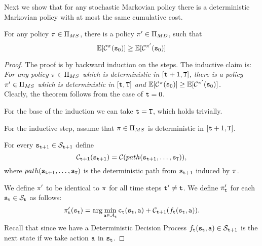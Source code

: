 Next we show that for any stochastic Markovian policy there is a
deterministic Markovian policy with at most the same cumulative
cost.

\begin{theorem}
\label{chp2:stochastic-deterministic}
For any policy $\pi\in \Pi_{MS}$, there is a policy
$\pi'\in\Pi_{MD}$, such that
\[
\mathbb{E}[\mathcal{C}^\pi({\tt s}_0)]\geq \mathbb{E}[\mathcal{C}^{\pi'}({\tt s}_0)]
\]
\end{theorem}

\begin{proof}
The proof is by backward induction on the steps. The inductive claim is:\\
{\em For any policy $\pi\in \Pi_{MS}$ which is deterministic in
$[{\tt t}+1,{\tt T}]$, there is a policy $\pi'\in \Pi_{MS}$
which is deterministic in $[{\tt t},{\tt T}]$ and
$\mathbb{E}[\mathcal{C}^\pi({\tt s}_0)]\geq
\mathbb{E}[\mathcal{C}^{\pi'}({\tt s}_0)]$.}\\
Clearly, the theorem follows from the case of ${\tt t}=0$.

For the base of the induction we can take ${\tt t}={\tt T}$, which
holds trivially.

For the inductive step, assume that $\pi\in \Pi_{MS}$ is
deterministic in $[{\tt t}+1,{\tt T}]$.


For every ${\tt s}_{{\tt t}+1}\in \mathcal{S}_{{\tt t}+1}$ define
\[
\mathcal{C}_{{\tt t}+1}({\tt s}_{{\tt t}+1})=\mathcal{C}(path({\tt s}_{{\tt t}+1},
\dots , {\tt s}_{\tt T})),
\]
where $path({\tt s}_{{\tt t}+1}, \dots , {\tt s}_{\tt T})$ is the
deterministic path from ${\tt s}_{{\tt t}+1}$ induced by $\pi$.

We define $\pi'$ to be identical to $\pi$ for all time steps
${\tt t}'\neq {\tt t}$. We define $\pi'_{\tt t}$ for each
${\tt s}_{\tt t}\in \mathcal{S}_{\tt t}$ as follows:
\begin{equation}
\label{eq:sec2-MS-MD}
\pi'_{\tt t}({\tt s}_{\tt t})=\arg\min_{{\tt a}\in
\mathcal{A}_{\tt t}} {\tt c}_{{\tt t}}({\tt s}_{\tt t},{\tt a})+
\mathcal{C}_{{\tt t}+1}(f_{\tt t}({\tt s}_{\tt t},{\tt a})).
\end{equation}
Recall that since we have a Deterministic Decision Process
$f_{\tt t}({\tt s}_{\tt t},{\tt a})\in \mathcal{S}_{{\tt t}+1}$ is
the next state if we take action ${\tt a}$ in ${\tt s}_{\tt t}$.


\end{proof}
